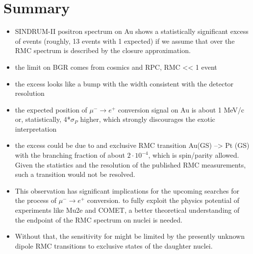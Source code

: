 \documentclass[12pt]{article}
\begin{document}
\newpage
\section{ Summary }

\begin{itemize}
\item
  SINDRUM-II positron spectrum on Au shows a statistically significant excess
  of events (roughly, 13 events with 1 expected) if we assume that over the RMC
  spectrum is described by the closure approximation.
\item
  the limit on BGR comes from cosmics and RPC, RMC << 1  event
\item
  the excess looks like a bump with the width consistent with the detector
  resolution
\item
  the expected position of $\mu^- \rightarrow e^+$ conversion signal on Au is
  about 1 MeV/c or, statistically, 4*$\sigma_P$ higher, which strongly discourages
  the exotic interpretation
\item
  the excess could be due to and exclusive RMC transition Au(GS) --> Pt (GS)
  with the branching fraction of about $2\cdot10^{-4}$, which is spin/parity
  allowed. Given the statistics and the resolution of the published RMC
  measurements, such a transition would not be resolved. 
\item
  This observation has significant implications for the upcoming
  searches
  for the process of $\mu^- \rightarrow e^+$ conversion. 
  to fully exploit the physics potential of experiments like Mu2e and COMET,
  a better theoretical understanding of the endpoint of the RMC spectrum
  on nuclei is needed. 
\item
  Without that, the sensitivity for might be limited by the presently unknown
  dipole RMC transitions to exclusive states of the daughter nuclei. 
\end{itemize}

% 
% 
% 


\end{document}
